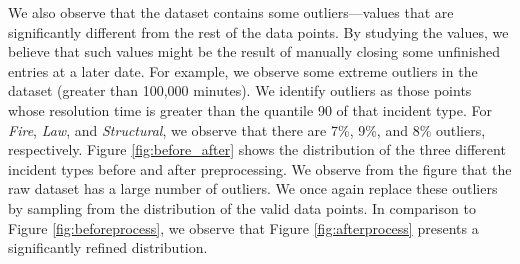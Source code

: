 {We also observe that the dataset contains some outliers---values that are significantly different from the rest of the data points.  By studying the values, we believe that such values might be the result of manually closing some unfinished entries at a later date. For example, we observe some extreme outliers in the dataset (greater than 100,000 minutes). We identify outliers as those points whose resolution time is greater than the quantile 90 of that incident type. For  \textit{Fire}, \textit{Law}, and  \textit{Structural}, we observe that there are 7\%, 9\%, and 8\% outliers, respectively.  Figure \ref{fig:before_after} shows the distribution of  the three different incident types before and after preprocessing.  We observe from the figure that the raw dataset has a large number of outliers.  We once again replace these outliers by sampling from the  distribution of the valid data points. In comparison  to Figure \ref{fig:beforeprocess}, we observe that Figure \ref{fig:afterprocess} presents a significantly refined distribution.


}
